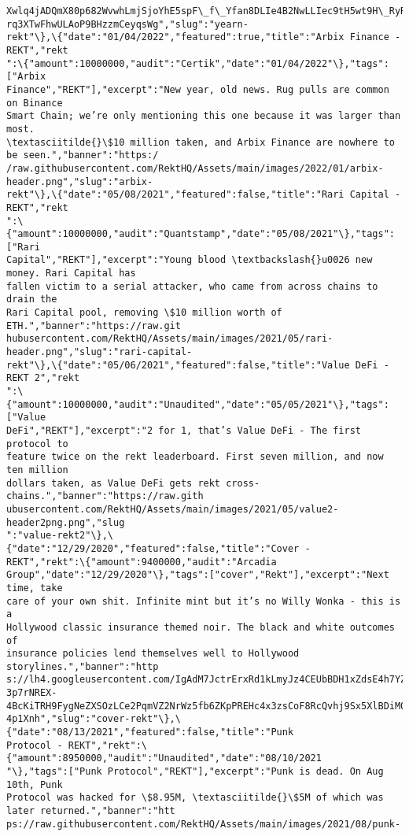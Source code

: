 \documentclass[11pt]{article}
\begin{document}
\begin{Verbatim}[commandchars=\\\{\}]
Xwlq4jADQmX80p682WvwhLmjSjoYhE5spF\_f\_Yfan8DLIe4B2NwLLIec9tH5wt9H\_RyRertgtKzELIVQ
rq3XTwFhwULAoP9BHzzmCeyqsWg","slug":"yearn-
rekt"\},\{"date":"01/04/2022","featured":true,"title":"Arbix Finance - REKT","rekt
":\{"amount":10000000,"audit":"Certik","date":"01/04/2022"\},"tags":["Arbix
Finance","REKT"],"excerpt":"New year, old news. Rug pulls are common on Binance
Smart Chain; we’re only mentioning this one because it was larger than most.
\textasciitilde{}\$10 million taken, and Arbix Finance are nowhere to be seen.","banner":"https:/
/raw.githubusercontent.com/RektHQ/Assets/main/images/2022/01/arbix-
header.png","slug":"arbix-
rekt"\},\{"date":"05/08/2021","featured":false,"title":"Rari Capital - REKT","rekt
":\{"amount":10000000,"audit":"Quantstamp","date":"05/08/2021"\},"tags":["Rari
Capital","REKT"],"excerpt":"Young blood \textbackslash{}u0026 new money. Rari Capital has
fallen victim to a serial attacker, who came from across chains to drain the
Rari Capital pool, removing \$10 million worth of ETH.","banner":"https://raw.git
hubusercontent.com/RektHQ/Assets/main/images/2021/05/rari-
header.png","slug":"rari-capital-
rekt"\},\{"date":"05/06/2021","featured":false,"title":"Value DeFi - REKT 2","rekt
":\{"amount":10000000,"audit":"Unaudited","date":"05/05/2021"\},"tags":["Value
DeFi","REKT"],"excerpt":"2 for 1, that’s Value DeFi - The first protocol to
feature twice on the rekt leaderboard. First seven million, and now ten million
dollars taken, as Value DeFi gets rekt cross-chains.","banner":"https://raw.gith
ubusercontent.com/RektHQ/Assets/main/images/2021/05/value2-header2png.png","slug
":"value-rekt2"\},\{"date":"12/29/2020","featured":false,"title":"Cover -
REKT","rekt":\{"amount":9400000,"audit":"Arcadia
Group","date":"12/29/2020"\},"tags":["cover","Rekt"],"excerpt":"Next time, take
care of your own shit. Infinite mint but it’s no Willy Wonka - this is a
Hollywood classic insurance themed noir. The black and white outcomes of
insurance policies lend themselves well to Hollywood storylines.","banner":"http
s://lh4.googleusercontent.com/IgAdM7JctrErxRd1kLmyJz4CEUbBDH1xZdsE4h7YZ\_6NTRmWbF
3p7rNREX-4BcKiTRH9FygNeZXSOzLCe2PqmVZ2NrWz5fb6ZKpPREHc4x3zsCoF8RcQvhj9Sx5XlBDiM0
4p1Xnh","slug":"cover-rekt"\},\{"date":"08/13/2021","featured":false,"title":"Punk
Protocol - REKT","rekt":\{"amount":8950000,"audit":"Unaudited","date":"08/10/2021
"\},"tags":["Punk Protocol","REKT"],"excerpt":"Punk is dead. On Aug 10th, Punk
Protocol was hacked for \$8.95M, \textasciitilde{}\$5M of which was later returned.","banner":"htt
ps://raw.githubusercontent.com/RektHQ/Assets/main/images/2021/08/punk-

\end{Verbatim}
\end{document}
